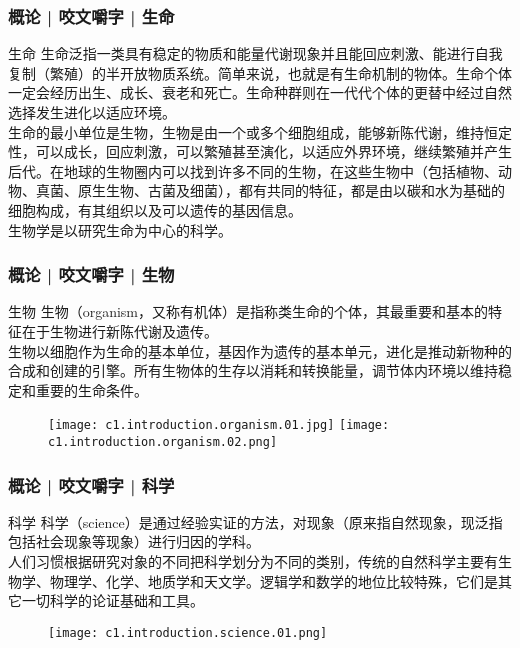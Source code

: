 \begin{frame}
  \frametitle{概论 | 咬文嚼字 | 生命}
  \begin{block}{生命}
生命泛指一类具有稳定的物质和能量代谢现象并且能回应刺激、能进行自我复制（繁殖）的半开放物质系统。简单来说，也就是有生命机制的物体。生命个体一定会经历出生、成长、衰老和死亡。生命种群则在一代代个体的更替中经过自然选择发生进化以适应环境。\\
    \vspace{1em}
生命的最小单位是生物，生物是由一个或多个细胞组成，能够新陈代谢，维持恒定性，可以成长，回应刺激，可以繁殖甚至演化，以适应外界环境，继续繁殖并产生后代。在地球的生物圈内可以找到许多不同的生物，在这些生物中（包括植物、动物、真菌、原生生物、古菌及细菌），都有共同的特征，都是由以碳和水为基础的细胞构成，有其组织以及可以遗传的基因信息。\\
    \vspace{1em}
生物学是以研究生命为中心的科学。 
  \end{block}
\end{frame}

\begin{frame}
  \frametitle{概论 | 咬文嚼字 | 生物}
  \begin{block}{生物}
    生物（organism，又称有机体）是指称类生命的个体，其最重要和基本的特征在于生物进行新陈代谢及遗传。\\
生物以细胞作为生命的基本单位，基因作为遗传的基本单元，进化是推动新物种的合成和创建的引擎。所有生物体的生存以消耗和转换能量，调节体内环境以维持稳定和重要的生命条件。
  \end{block}
  \pause
  \begin{figure}
    \centering
    \texttt{[image: c1.introduction.organism.01.jpg]}\qquad
    \texttt{[image: c1.introduction.organism.02.png]}
  \end{figure}
\end{frame}

\begin{frame}
  \frametitle{概论 | 咬文嚼字 | 科学}
  \begin{block}{科学}
    科学（science）是通过经验实证的方法，对现象（原来指自然现象，现泛指包括社会现象等现象）进行归因的学科。\\
    \vspace{1em}
人们习惯根据研究对象的不同把科学划分为不同的类别，传统的自然科学主要有生物学、物理学、化学、地质学和天文学。逻辑学和数学的地位比较特殊，它们是其它一切科学的论证基础和工具。
  \end{block}
  \pause
  \begin{figure}
    \centering
    \texttt{[image: c1.introduction.science.01.png]}
  \end{figure}
\end{frame}

